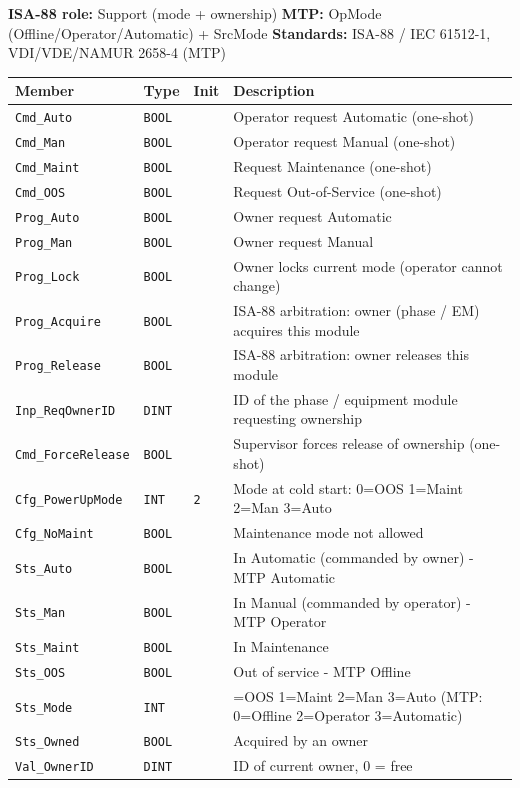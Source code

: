 {\small\textbf{ISA-88 role:} Support (mode + ownership) \quad \textbf{MTP:} OpMode (Offline/\allowbreak{}Operator/\allowbreak{}Automatic) + SrcMode \quad \textbf{Standards:} ISA-88 /\allowbreak{} IEC 61512-1, VDI/\allowbreak{}VDE/\allowbreak{}NAMUR 2658-4 (MTP)}
{\footnotesize
\begin{longtable}{@{}>{\raggedright\arraybackslash}p{3.4cm}>{\raggedright\arraybackslash}p{3.3cm}>{\raggedright\arraybackslash}p{1.3cm}>{\raggedright\arraybackslash}p{6.4cm}@{}}
\toprule
\rowcolor{tblhead}\textbf{Member} & \textbf{Type} & \textbf{Init} & \textbf{Description} \\
\midrule
\endhead
\texttt{Cmd\_Auto} & \texttt{BOOL} &  & Operator request Automatic (one-shot) \\
\texttt{Cmd\_Man} & \texttt{BOOL} &  & Operator request Manual (one-shot) \\
\texttt{Cmd\_Maint} & \texttt{BOOL} &  & Request Maintenance (one-shot) \\
\texttt{Cmd\_OOS} & \texttt{BOOL} &  & Request Out-of-Service (one-shot) \\
\texttt{Prog\_Auto} & \texttt{BOOL} &  & Owner request Automatic \\
\texttt{Prog\_Man} & \texttt{BOOL} &  & Owner request Manual \\
\texttt{Prog\_Lock} & \texttt{BOOL} &  & Owner locks current mode (operator cannot change) \\
\texttt{Prog\_Acquire} & \texttt{BOOL} &  & ISA-88 arbitration: owner (phase /\allowbreak{} EM) acquires this module \\
\texttt{Prog\_Release} & \texttt{BOOL} &  & ISA-88 arbitration: owner releases this module \\
\texttt{Inp\_ReqOwnerID} & \texttt{DINT} &  & ID of the phase /\allowbreak{} equipment module requesting ownership \\
\texttt{Cmd\_ForceRelease} & \texttt{BOOL} &  & Supervisor forces release of ownership (one-shot) \\
\texttt{Cfg\_PowerUpMode} & \texttt{INT} & \texttt{2} & Mode at cold start: 0=OOS 1=Maint 2=Man 3=Auto \\
\texttt{Cfg\_NoMaint} & \texttt{BOOL} &  & Maintenance mode not allowed \\
\texttt{Sts\_Auto} & \texttt{BOOL} &  & In Automatic (commanded by owner) - MTP Automatic \\
\texttt{Sts\_Man} & \texttt{BOOL} &  & In Manual (commanded by operator) - MTP Operator \\
\texttt{Sts\_Maint} & \texttt{BOOL} &  & In Maintenance \\
\texttt{Sts\_OOS} & \texttt{BOOL} &  & Out of service - MTP Offline \\
\texttt{Sts\_Mode} & \texttt{INT} &  & 0=OOS 1=Maint 2=Man 3=Auto  (MTP: 0=Offline 2=Operator 3=Automatic) \\
\texttt{Sts\_Owned} & \texttt{BOOL} &  & Acquired by an owner \\
\texttt{Val\_OwnerID} & \texttt{DINT} &  & ID of current owner, 0 = free \\
\bottomrule
\end{longtable}
}
